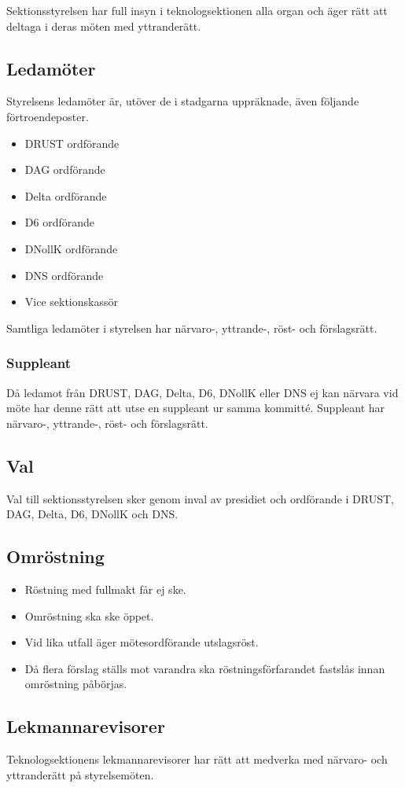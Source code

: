 Sektionsstyrelsen har full insyn i teknologsektionen alla organ och äger rätt att deltaga i deras möten med yttranderätt. 

\subsection{Ledamöter}
Styrelsens ledamöter är, utöver de i stadgarna uppräknade, även följande förtroendeposter. 
\begin{itemize}
  \item DRUST ordförande 
  \item DAG ordförande 
  \item Delta ordförande 
  \item D6 ordförande 
  \item DNollK ordförande
  \item DNS ordförande
  \item Vice sektionskassör
\end{itemize}

Samtliga ledamöter i styrelsen har närvaro-, yttrande-, röst- och förslagsrätt.

\subsubsection{Suppleant}
Då ledamot från DRUST, DAG, Delta, D6, DNollK eller DNS ej kan närvara vid möte har denne rätt att utse en suppleant ur samma kommitté.
Suppleant har närvaro-, yttrande-, röst- och förslagsrätt.

\subsection{Val}
Val till sektionsstyrelsen sker genom inval av presidiet och ordförande i DRUST, DAG, Delta, D6, DNollK och DNS.

\subsection{Omröstning} 

\begin{itemize}
  \item Röstning med fullmakt får ej ske.
  \item Omröstning ska ske öppet.
  \item Vid lika utfall äger mötesordförande utslagsröst.
  \item Då flera förslag ställs mot varandra ska röstningsförfarandet fastslås innan omröstning påbörjas.
\end{itemize}

\subsection{Lekmannarevisorer}
Teknologsektionens lekmannarevisorer har rätt att medverka med närvaro-
och yttranderätt på styrelsemöten.
\newpage

